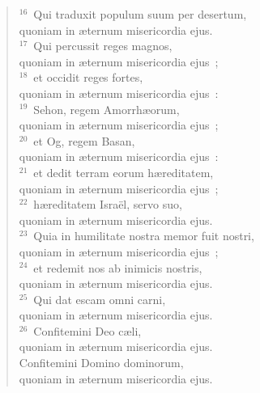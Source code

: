 \begin{verse}
${}^{16}$~Qui traduxit populum suum per desertum,\\ quoniam in \ae ternum misericordia ejus.\\
${}^{17}$~Qui percussit reges magnos,\\ quoniam in \ae ternum misericordia ejus~;\\
${}^{18}$~et occidit reges fortes,\\ quoniam in \ae ternum misericordia ejus~:\\
${}^{19}$~Sehon, regem Amorrh\ae orum,\\ quoniam in \ae ternum misericordia ejus~;\\
${}^{20}$~et Og, regem Basan,\\ quoniam in \ae ternum misericordia ejus~:\\
${}^{21}$~et dedit terram eorum h\ae reditatem,\\ quoniam in \ae ternum misericordia ejus~;\\
${}^{22}$~h\ae reditatem Isra\"el, servo suo,\\ quoniam in \ae ternum misericordia ejus.\\
${}^{23}$~Quia in humilitate nostra memor fuit nostri,\\ quoniam in \ae ternum misericordia ejus~;\\
${}^{24}$~et redemit nos ab inimicis nostris,\\ quoniam in \ae ternum misericordia ejus.\\
${}^{25}$~Qui dat escam omni carni,\\ quoniam in \ae ternum misericordia ejus.\\
${}^{26}$~Confitemini Deo c\ae li,\\ quoniam in \ae ternum misericordia ejus.\\ Confitemini Domino dominorum,\\ quoniam in \ae ternum misericordia ejus.\end{verse}



